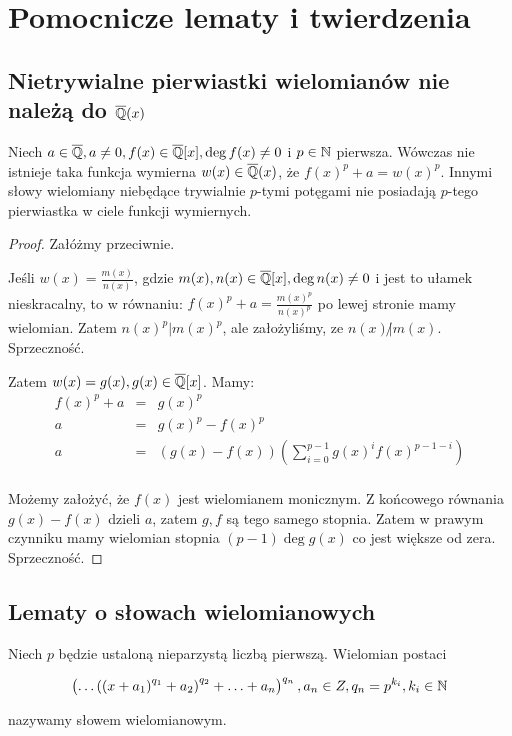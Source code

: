 \chapter{Pomocnicze lematy i twierdzenia}
\label{ch:auxiliary}
\section{Nietrywialne pierwiastki wielomianów nie należą do $\overline{\mathbb{Q}}(x)$}
\begin{lemma}
  Niech $a \in \overline{\mathbb{Q}}, a \neq 0, f(x) \in \overline{\mathbb{Q}}[x], \deg f(x)
  \neq 0$ i $p \in \mathbb{N}$ pierwsza.  Wówczas nie istnieje taka funkcja wymierna
  $w(x) \in \overline{\mathbb{Q}}(x)$, że $f(x)^{p} + a = w(x)^p$. Innymi słowy
  wielomiany niebędące trywialnie $p$-tymi potęgami nie posiadają $p$-tego
  pierwiastka w ciele funkcji wymiernych.
  \label{lem:nontrivial_roots}
\end{lemma}

\begin{proof}
Załóżmy przeciwnie.

Jeśli $w(x) = \frac{m(x)}{n(x)}$, gdzie $m(x), n(x) \in \overline{\mathbb{Q}}[x], \deg
n(x) \neq 0$ i jest to ułamek nieskracalny, to w równaniu: $f(x)^{p} + a =
\frac{m(x)^p}{n(x)^p}$ po lewej stronie mamy wielomian. Zatem $n(x)^p | m(x)^p$,
ale założyliśmy, ze $n(x) \! \not| m(x)$. Sprzeczność.

Zatem $w(x) = g(x), g(x) \in \overline{\mathbb{Q}}[x]$. Mamy:
\begin{eqnarray*}
  f(x)^p + a &=& g(x)^p \\
  a &=& g(x)^p - f(x)^p\\
  a &=& \left(g(x) - f(x)\right)\left(\sum_{i=0}^{p-1}g(x)^if(x)^{p-1 - i}\right)\\
\end{eqnarray*}

Możemy założyć, że $f(x)$ jest wielomianem monicznym. Z końcowego równania $g(x)
- f(x)$ dzieli $a$, zatem $g, f$ są tego samego stopnia. Zatem w prawym
czynniku mamy wielomian stopnia $(p-1)\deg g(x)$ co jest większe od zera.
Sprzeczność.
\end{proof}

\section{Lematy o słowach wielomianowych}
\begin{defin}
  Niech $p$ będzie ustaloną nieparzystą liczbą pierwszą. Wielomian postaci

  \begin{equation}
    \left( \ldots \left(\left(x + a_1\right)^{q_1} + a_2\right)^{q_2} +
      \ldots + a_n\right)^{q_n}, a_n \in Z, q_n = p^{k_i}, k_i \in \mathbb{N}
  \label{eq:polynomial_word_extended}
  \end{equation}

  nazywamy słowem wielomianowym.
\end{defin}

